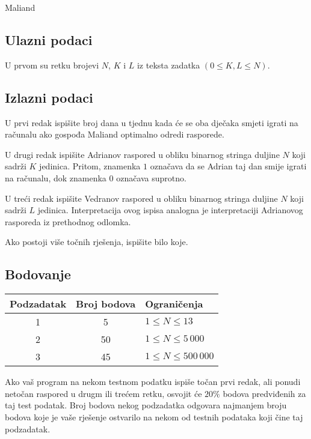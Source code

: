 \begin{statement}[
  problempoints=100,
  timelimit=2 sekunde,
  memorylimit=512 MiB,
]{Maliand}
\subsection*{Ulazni podaci}
U prvom su retku brojevi $N$, $K$ i $L$ iz teksta zadatka $(0 \le K, L \le N)$.

\subsection*{Izlazni podaci}

U prvi redak ispišite broj dana u tjednu kada će se oba dječaka smjeti igrati
na računalu ako gospođa Maliand optimalno odredi rasporede.

U drugi redak ispišite Adrianov raspored u obliku binarnog stringa duljine $N$
koji sadrži $K$ jedinica. Pritom, znamenka $1$ označava da se Adrian taj dan
smije igrati na računalu, dok znamenka $0$ označava suprotno.

U treći redak ispišite Vedranov raspored u obliku binarnog stringa duljine $N$
koji sadrži $L$ jedinica. Interpretacija ovog ispisa analogna je interpretaciji
Adrianovog rasporeda iz prethodnog odlomka.

Ako postoji više točnih rješenja, ispišite bilo koje.

\subsection*{Bodovanje}
{\renewcommand{\arraystretch}{1.4}
  \setlength{\tabcolsep}{6pt}
  \begin{tabular}{ccl}
 Podzadatak & Broj bodova & Ograničenja \\ \midrule
  1 & 5 & $1 \le N \le 13$\\
  2 & 50 & $1 \le N \le 5\,000$\\
  3 & 45 & $1 \le N \le 500\,000$\\
\end{tabular}}

Ako vaš program na nekom testnom podatku ispiše točan prvi redak, ali ponudi
netočan raspored u drugm ili trećem retku, osvojit će $20\%$ bodova predviđenih
za taj test podatak. Broj bodova nekog podzadatka odgovara najmanjem broju
bodova koje je vaše rješenje ostvarilo na nekom od testnih podataka koji čine
taj podzadatak.


\end{statement}
